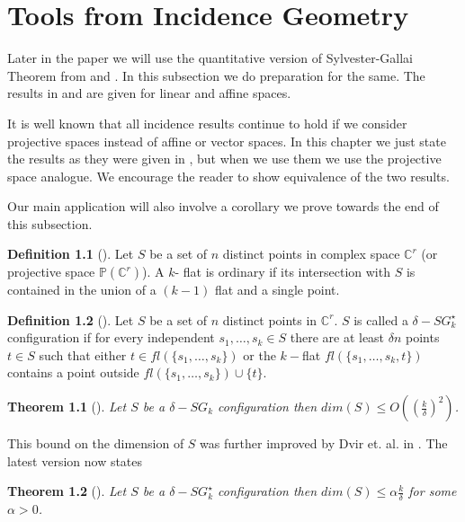 \documentclass[12pt]{caltech_thesis}
\theoremstyle{plain}
\newtheorem{theorem}{Theorem}
\theoremstyle{definition}
\newtheorem{definition}{Definition}
\newcommand{\PP}{\mathbb{P}}
\newcommand{\C}{\mathbb{C}}
\begin{document}
\chapter{Tools from Incidence Geometry}\label{appendix:incidence}

Later in the paper we will use the quantitative version of Sylvester-Gallai Theorem from \cite{BDWY11} and \cite{DSW12}. 
In this subsection we do preparation for the same. The results in \cite{BDWY11} and \cite{DSW12} are given for linear and
affine spaces. 

It is well known that all incidence results continue to hold if we consider projective spaces instead of affine or vector spaces.
In this chapter we just state the results as they were given in \cite{BDWY11}, but when we use them we use the projective space analogue.
We encourage the reader to show equivalence of the two results.

Our main application will also involve a corollary we prove towards the end of this subsection.


\begin{definition}[\cite{BDWY11}]\label{elementaryset}
Let $S$ be a set of $n$ distinct points in complex space $\C^r$ (or projective space $\PP(\C^r)$). A $k$- flat
is ordinary if its intersection with $S$ is contained in the union of a $(k-1)$ flat and a single point.
\end{definition}




\begin{definition}[\cite{BDWY11}]
Let $S$ be a set of $n$ distinct points in $\C^r$. $S$ is called a $\delta -
SG_k^{\star}$ configuration if for every
independent $s_1,\ldots,s_k \in S$ there are at least $\delta n$ points $t\in S$
such that either $t\in fl(\{s_1,\ldots,s_k\})$ or the $k-$flat
$fl(\{s_1,\ldots,s_k,t\})$ contains a point outside $fl(\{s_1,\ldots,s_k\})\cup \{t\}$.
\end{definition}

\begin{theorem}[\cite{BDWY11}]
Let $S$ be a $\delta-SG_k$ configuration then
$dim(S) \leq O((\frac{k}{\delta})^2)$. 
\end{theorem}

This bound on the dimension of $S$ was further improved by Dvir et. al. in \cite{DSW12}. The latest version
now states
\begin{theorem}[\cite{DSW12}]\label{bdwy}
 Let $S$ be a $\delta-SG_k^{\star}$ configuration then
$dim(S) \leq \alpha\frac{k}{\delta}$ for some $\alpha>0$.
\end{theorem}
\end{document}
